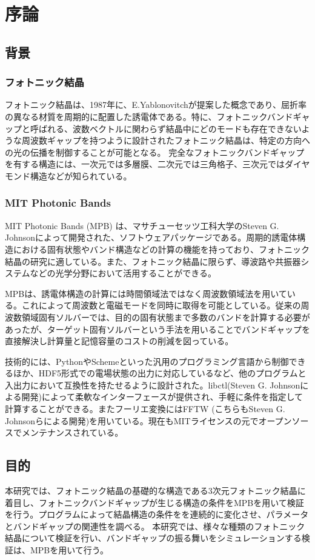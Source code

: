\documentclass[platex,dvipdfmx]{jsreport}
\begin{document}
\chapter{序論}


\section{背景}

\subsection{フォトニック結晶}


フォトニック結晶は、1987年に、E.Yablonovitchが提案した概念であり、屈折率の異なる材質を周期的に配置した誘電体である。特に、フォトニックバンドギャップと呼ばれる、波数ベクトルに関わらず結晶中にどのモードも存在できないような周波数ギャップを持つように設計されたフォトニック結晶は、特定の方向への光の伝播を制御することが可能となる。
完全なフォトニックバンドギャップを有する構造には、一次元では多層膜、二次元では三角格子、三次元ではダイヤモンド構造などが知られている。


\subsection{MIT Photonic Bands}

MIT Photonic Bands (MPB) は、マサチューセッツ工科大学のSteven G. Johnsonによって開発された、ソフトウェアパッケージである。周期的誘電体構造における固有状態やバンド構造などの計算の機能を持っており、フォトニック結晶の研究に適している。また、フォトニック結晶に限らず、導波路や共振器システムなどの光学分野において活用することができる。

MPBは、誘電体構造の計算には時間領域法ではなく周波数領域法を用いている。これによって周波数と電磁モードを同時に取得を可能としている。従来の周波数領域固有ソルバーでは、目的の固有状態まで多数のバンドを計算する必要があったが、ターゲット固有ソルバーという手法を用いることでバンドギャップを直接解決し計算量と記憶容量のコストの削減を図っている。


技術的には、PythonやSchemeといった汎用のプログラミング言語から制御できるほか、HDF5形式での電場状態の出力に対応しているなど、他のプログラムと入出力において互換性を持たせるように設計された。libctl(Steven G. Johnsonによる開発)によって柔軟なインターフェースが提供され、手軽に条件を指定して計算することができる。またフーリエ変換にはFFTW (こちらもSteven G. Johnsonらによる開発)を用いている。現在もMITライセンスの元でオープンソースでメンテナンスされている。


\section{目的}
本研究では、フォトニック結晶の基礎的な構造である3次元フォトニック結晶に着目し、フォトニックバンドギャップが生じる構造の条件をMPBを用いて検証を行う。プログラムによって結晶構造の条件をを連続的に変化させ、パラメータとバンドギャップの関連性を調べる。
本研究では、様々な種類のフォトニック結晶について検証を行い、バンドギャップの振る舞いをシミュレーションする検証は、MPBを用いて行う。
\end{document}
